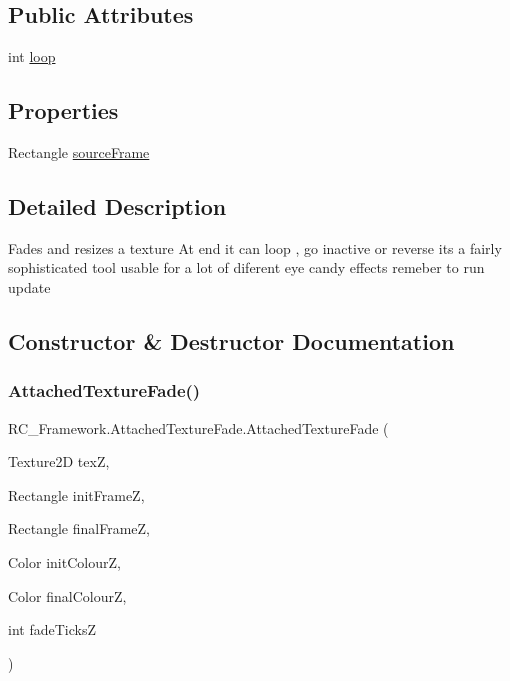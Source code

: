 \subsection*{Public Attributes}
\begin{DoxyCompactItemize}
\item 
int \mbox{\hyperlink{class_r_c___framework_1_1_attached_texture_fade_a4e1a8e468a64463a598f43f3a347e7c4}{loop}}
\end{DoxyCompactItemize}
\subsection*{Properties}
\begin{DoxyCompactItemize}
\item 
Rectangle \mbox{\hyperlink{class_r_c___framework_1_1_attached_texture_fade_a2b22f8a915cad35ae249c3cab1b8272b}{source\+Frame}}
\end{DoxyCompactItemize}


\subsection{Detailed Description}
Fades and resizes a texture At end it can loop , go inactive or reverse its a fairly sophisticated tool usable for a lot of diferent eye candy effects remeber to run update 



\subsection{Constructor \& Destructor Documentation}
\mbox{\label{class_r_c___framework_1_1_attached_texture_fade_a48153baf36d718ea055287af0688a691}} 
\subsubsection{\texorpdfstring{Attached\+Texture\+Fade()}{AttachedTextureFade()}}
{\footnotesize\ttfamily R\+C\+\_\+\+Framework.\+Attached\+Texture\+Fade.\+Attached\+Texture\+Fade (\begin{DoxyParamCaption}\item[{Texture2D}]{texZ,  }\item[{Rectangle}]{init\+FrameZ,  }\item[{Rectangle}]{final\+FrameZ,  }\item[{Color}]{init\+ColourZ,  }\item[{Color}]{final\+ColourZ,  }\item[{int}]{fade\+TicksZ }\end{DoxyParamCaption})}



